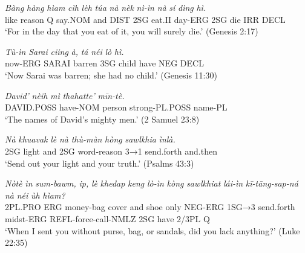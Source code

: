 \documentclass[
  11pt,
  a4paper,
]{article}
\newcommand{\tdimword}[1]{\textit{#1}}
\renewcommand{\textsc}[1]{{\footnotesize\MakeUppercase{#1}}}
\newcommand{\glossquote}[1]{`#1'}
\begin{document}
\begin{exe}
\ex \label{ex:stem-nek-gen2}
\gll \tdimword{Bàng} \tdimword{hàng} \tdimword{hìam} \tdimword{cìh} \tdimword{lèh} \tdimword{túa} \tdimword{nà} \tdimword{nèk} \tdimword{nì-ìn} \tdimword{nà} \tdimword{sí} \tdimword{dìng} \tdimword{hì.} \\
     like reason \textsc{q} say.\textsc{nom} and \textsc{dist} \textsc{2sg} eat.\textsc{ii} day-\textsc{erg} \textsc{2sg} die \textsc{irr} \textsc{decl} \\
\glt \glossquote{For in the day that you eat of it, you will surely die.} (Genesis 2:17)
\end{exe}

\begin{exe}
\ex \label{ex:stem-nei-gen11}
\gll \tdimword{Tù-ìn} \tdimword{Sarai} \tdimword{ciing} \tdimword{à,} \tdimword{tá} \tdimword{néi} \tdimword{lò} \tdimword{hì.} \\
     now-\textsc{erg} \textsc{sarai} barren \textsc{3sg} child have \textsc{neg} \textsc{decl} \\
\glt \glossquote{Now Sarai was barren; she had no child.} (Genesis 11:30)
\end{exe}

\begin{exe}
\ex \label{ex:stem-neih-2sam23}
\gll \tdimword{David'} \tdimword{nèih} \tdimword{mì} \tdimword{thahatte'} \tdimword{mīn-tè.} \\
     \textsc{david}.\textsc{poss} have-\textsc{nom} person strong-\textsc{pl}.\textsc{poss} name-\textsc{pl} \\
\glt \glossquote{The names of David's mighty men.} (2 Samuel 23:8)
\end{exe}

\begin{exe}
\ex \label{ex:stem-sawlkhia-ps43}
\gll \tdimword{Nà} \tdimword{khuavak} \tdimword{lè} \tdimword{nà} \tdimword{thù-màn} \tdimword{hòng} \tdimword{sawlkhia} \tdimword{ìnlà.} \\
     \textsc{2sg} light and \textsc{2sg} word-reason \textsc{3→1} send.forth and.then \\
\glt \glossquote{Send out your light and your truth.} (Psalms 43:3)
\end{exe}

\begin{exe}
\ex \label{ex:stem-sawlkhiat-luke22}
\gll \tdimword{Nòtè} \tdimword{ìn} \tdimword{sum-bawm,} \tdimword{ip,} \tdimword{lè} \tdimword{khedap} \tdimword{keng} \tdimword{lò-ìn} \tdimword{kòng} \tdimword{sawlkhiat} \tdimword{lái-ìn} \tdimword{kī-tāng-sap-ná} \tdimword{nà} \tdimword{néi} \tdimword{ùh} \tdimword{hìam?} \\
     \textsc{2pl}.\textsc{pro} \textsc{erg} money-bag cover and shoe only \textsc{neg}-\textsc{erg} \textsc{1sg→3} send.forth midst-\textsc{erg} \textsc{refl}-force-call-\textsc{nmlz} \textsc{2sg} have 2/3PL \textsc{q} \\
\glt \glossquote{When I sent you without purse, bag, or sandals, did you lack anything?} (Luke 22:35)
\end{exe}
\end{document}
